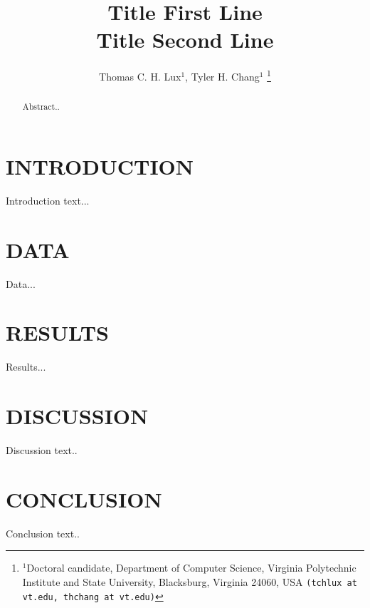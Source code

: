 \documentclass[letterpaper, 10 pt, conference]{ieeeconf}  %
\title{\LARGE \bf Title First Line \\ Title Second Line }
\author{Thomas C. H. Lux$^{1}$, Tyler H. Chang$^{1}$%
\thanks{$^{1}$Doctoral candidate, Department of Computer Science, Virginia Polytechnic Institute and State University, Blacksburg, Virginia 24060, USA {\tt\small (tchlux at vt.edu, thchang at vt.edu)}}%
}
\begin{document}
\maketitle
\thispagestyle{empty}
\pagestyle{empty}

\begin{abstract}

Abstract.. \cite{iozone}

\end{abstract}

\section{INTRODUCTION}
\label{sec:introduction}

Introduction text...

\section{DATA}
\label{sec:data}

Data...

\section{RESULTS}
\label{sec:results}

Results...

\section{DISCUSSION}
\label{sec:discussion}

Discussion text..


\section{CONCLUSION}
\label{sec:conclusion}

Conclusion text..



\end{document}
